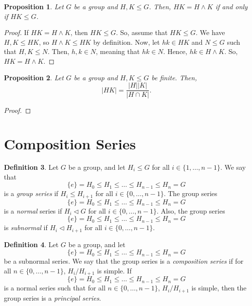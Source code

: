 \documentclass[a4paper, openany]{memoir}
\theoremstyle{definition}
\newtheorem{definition}{Definition}[section]
\theoremstyle{plain}
\newtheorem{proposition}[definition]{Proposition}
\begin{document}
    \begin{proposition}
        Let $G$ be a group and $H, K \leq G$. Then, $HK = H \wedge K$ if and only if $HK \leq G$.
    \end{proposition}
    \begin{proof}
        If $HK = H \wedge K$, then $HK \leq G$. So, assume that $HK \leq G$. We have $H, K \leq HK$, so $H \wedge K \leq HK$ by definition. Now, let $hk \in HK$ and $N \leq G$ such that $H, K \leq N$. Then, $h, k \in N$, meaning that $hk \in N$. Hence, $hk \in H \wedge K$. So, $HK = H \wedge K$.
    \end{proof}

    \begin{proposition}
        Let $G$ be a group and $H, K \leq G$ be finite. Then,
        \[|HK| = \frac{|H| |K|}{|H \cap K|}.\]
    \end{proposition}
    \begin{proof}
        
    \end{proof}
    \newpage
    
    \section{Composition Series}
    \begin{definition}
        Let $G$ be a group, and let $H_i \leq G$ for all $i \in \{1, \dots, n-1\}$. We say that 
        \[\{e\} = H_0 \leq H_1 \leq \dots \leq H_{n-1} \leq H_n = G\]
        is a \emph{group series} if $H_i \leq H_{i+1}$ for all $i \in \{0, \dots, n-1\}$. The group series
        \[\{e\} = H_0 \leq H_1 \leq \dots \leq H_{n-1} \leq H_n = G\]
        is a \emph{normal} series if $H_i \vartriangleleft G$ for all $i \in \{0, \dots, n-1\}$. Also, the group series
        \[\{e\} = H_0 \leq H_1 \leq \dots \leq H_{n-1} \leq H_n = G\]
        is \emph{subnormal} if $H_i \vartriangleleft H_{i+1}$ for all $i \in \{0, \dots, n-1\}$.
    \end{definition}

    \begin{definition}
        Let $G$ be a group, and let 
        \[\{e\} = H_0 \leq H_1 \leq \dots \leq H_{n-1} \leq H_n = G\]
        be a subnormal series. We say that the group series is a \emph{composition series} if for all $n \in \{0, \dots, n-1\}$, $H_i/H_{i+1}$ is simple. If 
        \[\{e\} = H_0 \leq H_1 \leq \dots \leq H_{n-1} \leq H_n = G\]
        is a normal series such that for all $n \in \{0, \dots, n-1\}$, $H_i/H_{i+1}$ is simple, then the group series is a \emph{principal series}.
    \end{definition}
\end{document}
